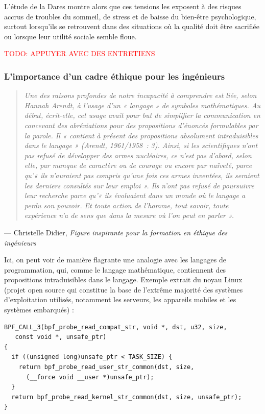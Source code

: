 \documentclass[12pt,a4paper]{report}
\begin{document}
L'étude de la Dares montre alors que ces tensions les exposent à des risques accrus de troubles du sommeil, de stress et de baisse du bien-être psychologique, surtout lorsqu'ils se retrouvent dans des situations où la qualité doit être sacrifiée ou lorsque leur utilité sociale semble floue.

\textcolor{red}{TODO: APPUYER AVEC DES ENTRETIENS}

\subsubsection{L'importance d'un cadre éthique pour les ingénieurs}

\begin{quote}
	\textit{Une des raisons profondes de notre incapacité à comprendre est liée, selon Hannah Arendt, à l'usage d'un « langage » de symboles mathématiques. Au début, écrit-elle, cet usage avait pour but de simplifier la communication en concevant des abréviations pour des propositions d'énoncés formulables par la parole. Il « contient à présent des propositions absolument intraduisibles dans le langage » (Arendt, 1961/1958~: 3).
Ainsi, si les scientifiques n'ont pas refusé de développer des armes nucléaires, ce n'est pas d'abord, selon elle, par manque de caractère ou de courage ou encore par naïveté, parce qu'« ils n'auraient pas compris qu'une fois ces armes inventées, ils seraient les derniers consultés sur leur emploi ». 
Ils n'ont pas refusé de poursuivre leur recherche parce qu'« ils évoluaient dans un monde où le langage a perdu son pouvoir. Et toute action de l'homme, tout savoir, toute expérience n'a de sens que dans la mesure où l'on peut en parler ».}
\end{quote}
\hfill --- Christelle Didier, \textit{Figure inspirante pour la formation en éthique des ingénieurs}

Ici, on peut voir de manière flagrante une analogie avec les langages de programmation, qui, comme le langage mathématique, contiennent des propositions intraduisibles dans le langage. Exemple extrait du noyau Linux (projet open source qui constitue la base de l'extrême majorité des systèmes d'exploitation utilisés, notamment les serveurs, les appareils mobiles et les systèmes embarqués) :

\begin{verbatim}
BPF_CALL_3(bpf_probe_read_compat_str, void *, dst, u32, size,
   const void *, unsafe_ptr)
{
  if ((unsigned long)unsafe_ptr < TASK_SIZE) {
    return bpf_probe_read_user_str_common(dst, size,
      (__force void __user *)unsafe_ptr);
  }
  return bpf_probe_read_kernel_str_common(dst, size, unsafe_ptr);
}
\end{verbatim}
\end{document}
